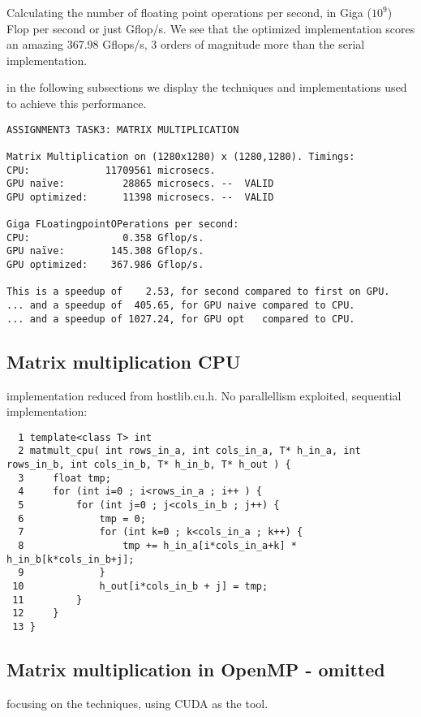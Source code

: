 \documentclass[a4paper,10pt]{article}
\begin{document}
Calculating the number of floating point operations per second, in Giga ($10^9$) Flop per second or just Gflop/s.
We see that the optimized implementation scores an amazing 367.98 Gflops/s, 3 orders of magnitude more than the serial implementation.

in the following subsections we display the techniques and implementations used to achieve this performance.

\begin{verbatim}
ASSIGNMENT3 TASK3: MATRIX MULTIPLICATION

Matrix Multiplication on (1280x1280) x (1280,1280). Timings:
CPU:             11709561 microsecs. 
GPU naïve:          28865 microsecs. --  VALID
GPU optimized:      11398 microsecs. --  VALID

Giga FLoatingpointOPerations per second:
CPU:                0.358 Gflop/s.
GPU naïve:        145.308 Gflop/s.
GPU optimized:    367.986 Gflop/s.

This is a speedup of    2.53, for second compared to first on GPU.
... and a speedup of  405.65, for GPU naive compared to CPU.
... and a speedup of 1027.24, for GPU opt   compared to CPU.
\end{verbatim}

\vfill

\subsection{Matrix multiplication CPU} implementation reduced from hostlib.cu.h. No parallellism exploited, sequential implementation:
\begin{verbatim}
  1 template<class T> int
  2 matmult_cpu( int rows_in_a, int cols_in_a, T* h_in_a, int rows_in_b, int cols_in_b, T* h_in_b, T* h_out ) {
  3     float tmp;
  4     for (int i=0 ; i<rows_in_a ; i++ ) {
  5         for (int j=0 ; j<cols_in_b ; j++) {
  6             tmp = 0;
  7             for (int k=0 ; k<cols_in_a ; k++) {
  8                 tmp += h_in_a[i*cols_in_a+k] * h_in_b[k*cols_in_b+j];
  9             }
 10             h_out[i*cols_in_b + j] = tmp;
 11         }
 12     }
 13 }
\end{verbatim}

\vfill

\subsection{Matrix multiplication in OpenMP - omitted}
focusing on the techniques, using CUDA as the tool.
\end{document}
